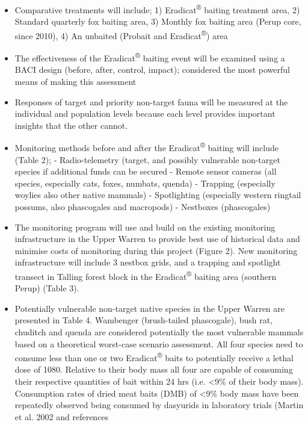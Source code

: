 \documentclass[version=last,
    paper=a4,                               %
    10pt,                                   %
    dvipsnames,
    oneside,                              %
    headings=openany,                       %
    open=any,
    BCOR=7mm,                               %
    DIV=15,     %
]{scrbook}
\begin{document}
\begin{itemize}
\itemsep1pt\parskip0pt
\item
  Comparative treatments will include; 1) Eradicat\textsuperscript{®}
  baiting treatment area, 2) Standard quarterly fox baiting area, 3)
  Monthly fox baiting area (Perup core, since 2010), 4) An unbaited
  (Probait and Eradicat\textsuperscript{®}) area
\item
  The effectiveness of the Eradicat\textsuperscript{®} baiting event
  will be examined using a BACI design (before, after, control, impact);
  considered the most powerful means of making this assessment
\item
  Responses of target and priority non-target fauna will be measured at
  the individual and population levels because each level provides
  important insights that the other cannot.
\item
  Monitoring methods before and after the Eradicat\textsuperscript{®}
  baiting will include (Table 2); - Radio-telemetry (target, and
  possibly vulnerable non-target species if additional funds can be
  secured - Remote sensor cameras (all species, especially cats, foxes,
  numbats, quenda) - Trapping (especially woylies also other native
  mammals) - Spotlighting (especially western ringtail possums, also
  phascogales and macropods) - Nestboxes (phascogales)
\item
  The monitoring program will use and build on the existing monitoring
  infrastructure in the Upper Warren to provide best use of historical
  data and minimise costs of monitoring during this project (Figure 2).
  New monitoring infrastructure will include 3 nestbox grids, and a
  trapping and spotlight transect in Talling forest block in the
  Eradicat\textsuperscript{®} baiting area (southern Perup) (Table 3).
\item
  Potentially vulnerable non-target native species in the Upper Warren
  are presented in Table 4. Wambenger (brush-tailed phascogale), bush
  rat, chuditch and quenda are considered potentially the most
  vulnerable mammals based on a theoretical worst-case scenario
  assessment. All four species need to consume less than one or two
  Eradicat\textsuperscript{®} baits to potentially receive a lethal dose
  of 1080. Relative to their body mass all four are capable of consuming
  their respective quantities of bait within 24 hrs (i.e. \textless{}9\%
  of their body mass). Consumption rates of dried meat baits (DMB) of
  \textless{}9\% body mass have been repeatedly observed being consumed
  by dasyurids in laboratory trials (Martin et al. 2002 and references

\end{itemize}
\end{document}
